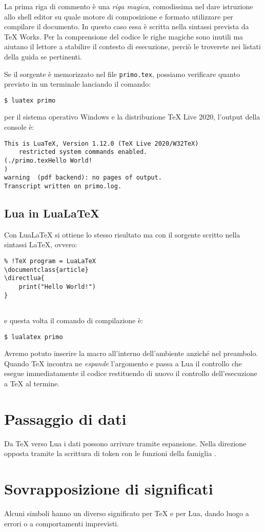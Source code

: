 La prima riga di commento è una \emph{riga magica}, comodissima nel dare
istruzione allo shell editor su quale motore di composizione e formato
utilizzare per compilare il documento. In questo caso essa è scritta nella
sintassi prevista da TeX Works. Per la comprensione del codice le righe magiche
sono inutili ma aiutano il lettore a stabilire il contesto di esecuzione, perciò
le troverete nei listati della guida se pertinenti.

Se il sorgente è memorizzato nel file \texttt{primo.tex}, possiamo verificare
quanto previsto in un terminale lanciando il comando:
\begin{Verbatim}
$ luatex primo
\end{Verbatim}
per il sistema operativo Windows e la distribuzione TeX Live 2020, l'output
della console è:
\begin{Verbatim}
This is LuaTeX, Version 1.12.0 (TeX Live 2020/W32TeX) 
    restricted system commands enabled.
(./primo.texHello World!
)
warning  (pdf backend): no pages of output.
Transcript written on primo.log.
\end{Verbatim}


\subsection{Lua in Lua\LaTeX}

Con Lua\LaTeX{} si ottiene lo stesso risultato ma con il sorgente scritto nella
sintassi \LaTeX, ovvero:
\begin{Verbatim}
% !TeX program = LuaLaTeX
\documentclass{article}
\directlua{
    print("Hello World!")
}


\end{Verbatim}
e questa volta il comando di compilazione è:
\begin{Verbatim}
$ lualatex primo
\end{Verbatim}

Avremo potuto inserire la macro all'interno dell'ambiente  anziché
nel preambolo. Quando \TeX{} incontra  ne \emph{espande}
l'argomento e passa a Lua il controllo che esegue immediatamente il
codice restituendo di nuovo il controllo dell'esecuzione a \TeX{} al termine.


\section{Passaggio di dati}

Da \TeX{} verso Lua i dati possono arrivare tramite espansione. Nella direzione
opposta tramite la scrittura di token con le funzioni della famiglia
.



\section{Sovrapposizione di significati}

Alcuni simboli hanno un diverso significato per \TeX{} e per Lua, dando luogo a
errori o a comportamenti imprevisti.



